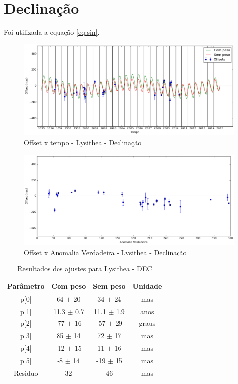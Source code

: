 \documentclass[11pt,a4paper]{report}
\begin{document}
\section*{Declinação}

Foi utilizada a equação \ref{eq:sin}.

\begin{figure}[h]
\caption{Offset x tempo - Lysithea - Declinação}
\includegraphics[scale=0.45]{Lysithea/DEC.png} 
\end{figure}

\begin{figure}[h]
\caption{Offset x Anomalia Verdadeira - Lysithea - Declinação}
\includegraphics[scale=0.45]{Lysithea/DEC_anom.png}  
\end{figure}

\begin{table}[h!]
\caption{\label{Tab: Lysithea-DEC} Resultados dos ajustes para Lysithea - DEC}
\begin{centering}
\begin{tabular}{cccc}
\hline
\hline
Parâmetro & Com peso & Sem peso & Unidade\tabularnewline
\hline
p[0] & 64 $\pm$ 20 & 34 $\pm$ 24 & mas\\
p[1] & 11.3 $\pm$ 0.7 & 11.1 $\pm$ 1.9 & anos\\
p[2] & -77 $\pm$ 16 & -57 $\pm$ 29 & graus\\
p[3] & 85 $\pm$ 14 & 72 $\pm$ 17 & mas\\
p[4] & -12 $\pm$ 15 & 11 $\pm$ 16 & mas\\
p[5] & -8 $\pm$ 14 & -19 $\pm$ 15 & mas\\
Residuo & 32 & 46 & mas\\
\hline 
\end{tabular} 
\par\end{centering}
\end{table}
\end{document}
